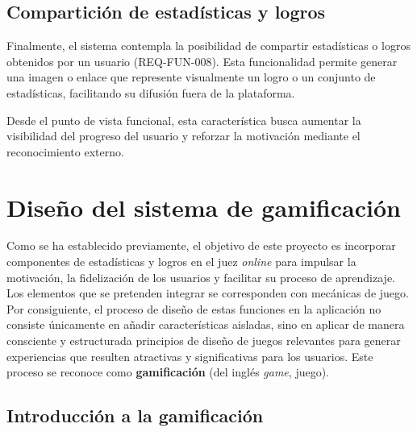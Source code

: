 \subsection{Compartición de estadísticas y logros}

Finalmente, el sistema contempla la posibilidad de compartir estadísticas o logros obtenidos por un usuario (REQ-FUN-008). Esta funcionalidad permite generar una imagen o enlace que represente visualmente un logro o un conjunto de estadísticas, facilitando su difusión fuera de la plataforma.

Desde el punto de vista funcional, esta característica busca aumentar la visibilidad del progreso del usuario y reforzar la motivación mediante el reconocimiento externo.

\section{Diseño del sistema de gamificación}

Como se ha establecido previamente, el objetivo de este proyecto es incorporar componentes de estadísticas y logros en el juez \textit{online} \aer para impulsar la motivación, la fidelización de los usuarios y facilitar su proceso de aprendizaje. Los elementos que se pretenden integrar se corresponden con mecánicas de juego. Por consiguiente, el proceso de diseño de estas funciones en la aplicación no consiste únicamente en añadir características aisladas, sino en aplicar de manera consciente y estructurada principios de diseño de juegos relevantes para generar experiencias que resulten atractivas y significativas para los usuarios. Este proceso se reconoce como \textbf{gamificación} (del inglés \textit{game}, juego). 

\subsection{Introducción a la gamificación}

